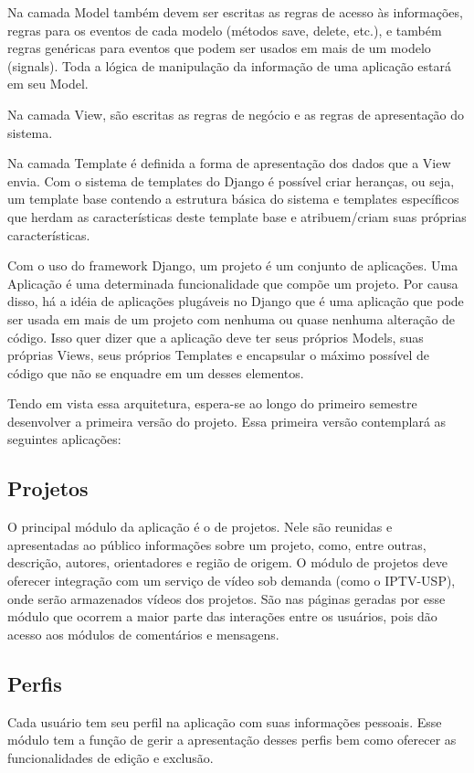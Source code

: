   Na camada Model também devem ser escritas as regras de acesso às informações, regras para os eventos de cada modelo (métodos save, delete, etc.), e também regras genéricas para eventos que podem ser usados em mais de um modelo (signals). Toda a lógica de manipulação da informação de uma aplicação estará em seu Model.

  Na camada View, são escritas as regras de negócio e as regras de apresentação do sistema.

  Na camada Template é definida a forma de apresentação dos dados que a View envia. Com o sistema de templates do Django é possível criar heranças, ou seja, um template base contendo a estrutura básica do sistema e templates específicos que herdam as características deste template base e atribuem/criam suas próprias características.

  Com o uso do framework Django, um projeto é um conjunto de aplicações. Uma Aplicação é uma determinada funcionalidade que compõe um projeto. Por causa disso, há a idéia de aplicações plugáveis no Django que é uma aplicação que pode ser usada em mais de um projeto com nenhuma ou quase nenhuma alteração de código. Isso quer dizer que a aplicação deve ter seus próprios Models, suas próprias Views, seus próprios Templates e encapsular o máximo possível de código que não se enquadre em um desses elementos.

  Tendo em vista essa arquitetura, espera-se ao longo do primeiro semestre desenvolver a primeira versão do projeto. Essa primeira versão contemplará as seguintes aplicações:

  \subsection{Projetos}
    O principal módulo da aplicação é o de projetos. Nele são reunidas e apresentadas ao público informações sobre um projeto, como, entre outras, descrição, autores, orientadores e região de origem. O módulo de projetos deve oferecer integração com um serviço de vídeo sob demanda (como o IPTV-USP), onde serão armazenados vídeos dos projetos. São nas páginas geradas por esse módulo que ocorrem a maior parte das interações entre os usuários, pois dão acesso aos módulos de comentários e mensagens.

  \subsection{Perfis}
    Cada usuário tem seu perfil na aplicação com suas informações pessoais. Esse módulo tem a função de gerir a apresentação desses perfis bem como oferecer as funcionalidades de edição e exclusão.


